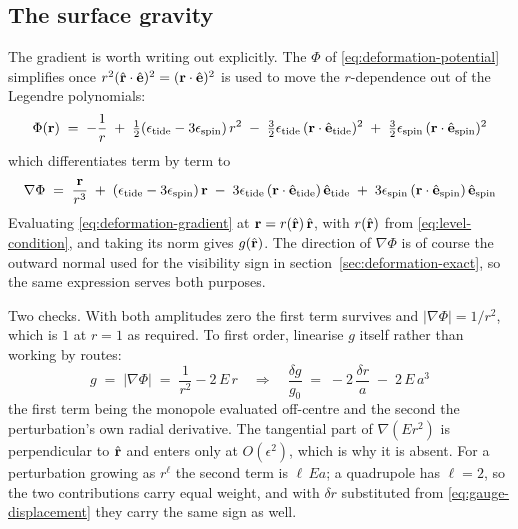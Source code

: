 \subsection{The surface gravity}
\label{sec:deformation-gravity}

The gradient is worth writing out explicitly.  The $\Phi$ of
\eqref{eq:deformation-potential} simplifies once $r^2(\hat{\mathbf r}\cdot\hat{\mathbf e})^2 =
({\mathbf r}\cdot\hat{\mathbf e})^2$ is used to move the $r$-dependence out of the Legendre
polynomials:
\begin{equation}
  \Phi({\mathbf r}) \;=\; -\frac{1}{r}
    \;+\; \tfrac12(\epsilon_\text{tide} - 3\epsilon_\text{spin})\,r^2
    \;-\; \tfrac32\epsilon_\text{tide}\,({\mathbf r}\cdot\hat{\mathbf e}_\text{tide})^2
    \;+\; \tfrac32\epsilon_\text{spin}\,({\mathbf r}\cdot\hat{\mathbf e}_\text{spin})^2
  \label{eq:deformation-potential-quadratic}
\end{equation}
which differentiates term by term to
\begin{equation}
  \nabla\Phi \;=\; \frac{{\mathbf r}}{r^3}
    \;+\; (\epsilon_\text{tide} - 3\epsilon_\text{spin})\,{\mathbf r}
    \;-\; 3\epsilon_\text{tide}\,({\mathbf r}\cdot\hat{\mathbf e}_\text{tide})\,\hat{\mathbf e}_\text{tide}
    \;+\; 3\epsilon_\text{spin}\,({\mathbf r}\cdot\hat{\mathbf e}_\text{spin})\,\hat{\mathbf e}_\text{spin}
  \label{eq:deformation-gradient}
\end{equation}
Evaluating \eqref{eq:deformation-gradient} at ${\mathbf r} = r(\hat{\mathbf r})\,\hat{\mathbf r}$, with $r(\hat{\mathbf r})$ from
\eqref{eq:level-condition}, and taking its norm gives $g(\hat{\mathbf r})$.  The direction of
$\nabla\Phi$ is of course the outward normal used for the visibility sign in
section~\ref{sec:deformation-exact}, so the same expression serves both purposes.

Two checks.  With both amplitudes zero the first term survives and $|\nabla\Phi| = 1/r^2$,
which is $1$ at $r = 1$ as required.  To first order, linearise $g$ itself rather than working
by routes:
\begin{equation}
  g \;=\; \bigl|\nabla\Phi\bigr| \;=\; \frac{1}{r^{2}} - 2\,E\,r
  \quad\Longrightarrow\quad
  \frac{\delta g}{g_0} \;=\; -2\,\frac{\delta r}{a} \;-\; 2\,E\,a^{3}
  \label{eq:deformation-gravity-shift}
\end{equation}
the first term being the monopole evaluated off-centre and the second the perturbation's own
radial derivative.  The tangential part of $\nabla(E r^{2})$ is perpendicular to
$\hat{\mathbf r}$ and enters only at $O(\epsilon^{2})$, which is why it is absent.  For a
perturbation growing as $r^{\ell}$ the second term is $\ell\,Ea$; a quadrupole has $\ell = 2$,
so the two contributions carry equal weight, and with $\delta r$ substituted from
\eqref{eq:gauge-displacement} they carry the same sign as well.

